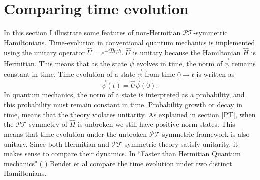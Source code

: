 \documentclass[12pt, a4paper]{report}
\newcommand\PT{\(\mathcal{PT}\)}
\begin{document}

\section{Comparing time evolution}\label{Interlude}

In this section I illustrate some features of non-Hermitian \PT-symmetric Hamiltonians. Time-evolution in conventional quantum mechanics is implemented using the unitary operator $\hat{U} = e^{-i\hat{H}t/\hbar}$.
$\hat{U}$ is unitary because the Hamiltonian $\hat{H}$ is Hermitian. This means that as the state $\vec{\psi}$ evolves in time, the norm of $\vec{\psi}$ remains constant in time. Time evolution of a state $\vec{\psi}$ from time $0 \rightarrow t$ is written as
\begin{equation}
\vec{\psi}(t) = \hat{U} \vec{\psi}(0).
\end{equation}
In quantum mechanics, the norm of a state is interpreted as a probability, and this probability must remain constant in time. Probability growth or decay in time, means that the theory violates unitarity. As explained in section \ref{PT}, when the \PT-symmetry of $\hat{H}$ is unbroken we still have positive norm states. This means that time evolution under the unbroken \PT-symmetric framework is also unitary\cite{Jones-Smith}\cite{ComplexExtension}\cite{Mostafazadeh2}. Since both Hermitian and \PT-symmetric theory satisfy unitarity, it makes sense to compare their dynamics. In ``Faster than Hermitian Quantum mechanics" (\cite{Bender_2007} ) Bender et al compare the time evolution under two distinct Hamiltonians. 
\end{document}
